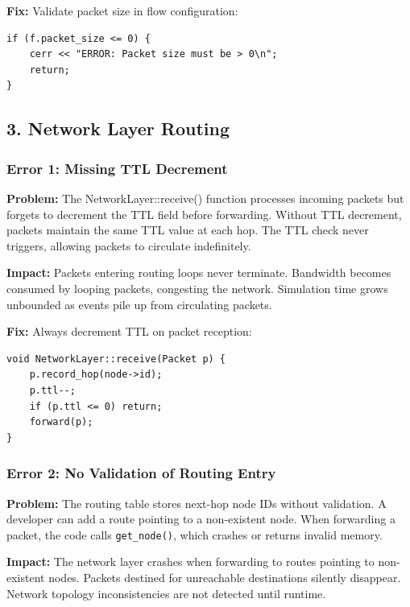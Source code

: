 \documentclass[11pt,a4paper]{article}
\begin{document}
\textbf{Fix:}
Validate packet size in flow configuration:
\begin{lstlisting}
if (f.packet_size <= 0) {
    cerr << "ERROR: Packet size must be > 0\n";
    return;
}
\end{lstlisting}

\vspace{0.5cm}

\subsection{3. Network Layer Routing}

\subsubsection{Error 1: Missing TTL Decrement}

\textbf{Problem:}
The NetworkLayer::receive() function processes incoming packets but forgets to decrement the TTL field before forwarding. Without TTL decrement, packets maintain the same TTL value at each hop. The TTL check never triggers, allowing packets to circulate indefinitely.

\textbf{Impact:}
Packets entering routing loops never terminate. Bandwidth becomes consumed by looping packets, congesting the network. Simulation time grows unbounded as events pile up from circulating packets.

\textbf{Fix:}
Always decrement TTL on packet reception:
\begin{lstlisting}
void NetworkLayer::receive(Packet p) {
    p.record_hop(node->id);
    p.ttl--;
    if (p.ttl <= 0) return;
    forward(p);
}
\end{lstlisting}

\vspace{0.5cm}

\subsubsection{Error 2: No Validation of Routing Entry}

\textbf{Problem:}
The routing table stores next-hop node IDs without validation. A developer can add a route pointing to a non-existent node. When forwarding a packet, the code calls \texttt{get\_node()}, which crashes or returns invalid memory.

\textbf{Impact:}
The network layer crashes when forwarding to routes pointing to non-existent nodes. Packets destined for unreachable destinations silently disappear. Network topology inconsistencies are not detected until runtime.
\end{document}
